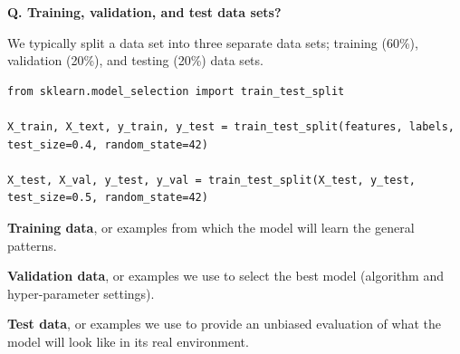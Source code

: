

\begin{frame}[fragile]{\textbf{Q. Training, validation, and test data sets?}}
  \begin{wideitemize}
    \item We typically split a data set into three separate data sets;
      training (60\%), validation (20\%), and testing (20\%) data sets.\medskip
      \begin{framed}
        { \scriptsize
\begin{verbatim}
from sklearn.model_selection import train_test_split

X_train, X_text, y_train, y_test = train_test_split(features, labels,
test_size=0.4, random_state=42)

X_test, X_val, y_test, y_val = train_test_split(X_test, y_test,
test_size=0.5, random_state=42)
\end{verbatim}
        }        
      \end{framed}
  \item \textbf{Training data}, or examples from which the model will learn the general patterns.\vspace{-0.5em}
  \item \textbf{Validation data}, or examples we use to select the best model (algorithm
    and hyper-parameter settings).\vspace{-0.5em}
  \item \textbf{Test data}, or examples we use to provide an unbiased evaluation of what
    the model will look like in its real environment.\vspace{-0.5em}
  \end{wideitemize}
\end{frame}


